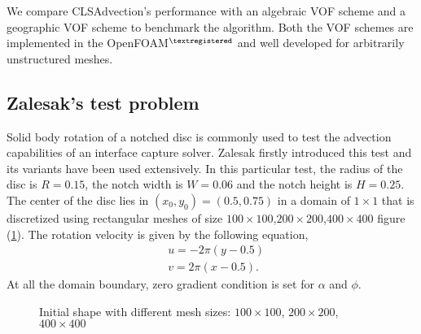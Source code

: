 We compare CLSAdvection's performance with an algebraic VOF scheme\citep{deshpande2012evaluating} and a geographic VOF scheme\citep{roenby2016computational} to benchmark the algorithm. Both the VOF schemes are implemented in the OpenFOAM$^{\textregistered}$ and well developed for arbitrarily unstructured meshes.

\subsection{Zalesak's test problem}
Solid body rotation of a notched disc is commonly used to test the advection capabilities of an interface capture solver. Zalesak firstly introduced this test \citep{zalesak1979fully} and its variants have been used extensively. In this particular test, the radius of the disc is $R=0.15$, the notch width is $W=0.06$ and the notch height is $H=0.25$. The center of the disc lies in $(x_0,y_0)=(0.5,0.75)$ in a domain of $1\times{1}$ that is discretized using rectangular meshes of size $100\times{100}$,$200\times{200}$,$400\times{400}$ figure (\ref{fig:hex0}). The rotation velocity is given by the following equation,
\begin{equation}\label{27}
\begin{split}
&u=-2\pi(y-0.5)
\\
&v=2\pi(x-0.5).
\end{split}
\end{equation}
At all the domain boundary, zero gradient condition is set for $\alpha$ and $\phi$. 

\begin{figure}[htbp]
\centering
{}
\quad
{}
\quad
{}
\caption{Initial shape with different mesh sizes: $100\times{100}$,  $200\times{200}$,  $400\times{400}$}
\label{fig:hex0}
\end{figure}

